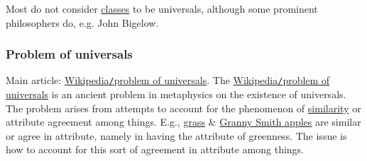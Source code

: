 \documentclass{article}
\begin{document}
Most do not consider \href{https://en.wikipedia.org/wiki/Class_(philosophy)}{classes} to be universals, although some prominent philosophers do, e.g. {\sc John Bigelow}.

\subsubsection{Problem of universals}
Main article: \href{https://en.wikipedia.org/wiki/Problem_of_universals}{Wikipedia{\tt/}problem of universals}. The \href{https://en.wikipedia.org/wiki/Problem_of_universals}{Wikipedia{\tt/}problem of universals} is an ancient problem in metaphysics on the existence of universals. The problem arises from attempts to account for the phenomenon of \href{https://en.wikipedia.org/wiki/Similarity_(philosophy)}{similarity} or attribute agreement among things. E.g., \href{https://en.wikipedia.org/wiki/Grass}{grass} \& \href{https://en.wikipedia.org/wiki/Granny_Smith}{{\sc Granny Smith} apples} are similar or agree in attribute, namely in having the attribute of greenness. The issue is how to account for this sort of agreement in attribute among things.
\end{document}

